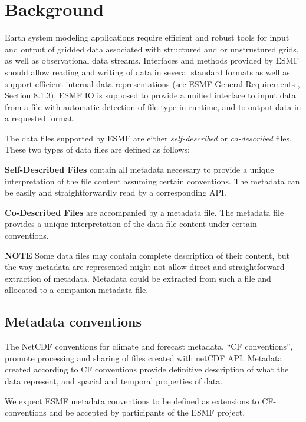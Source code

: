 
\section{Background}

Earth system modeling applications require efficient and robust tools
for input and output of gridded data associated with
structured and or unstrustured grids, as well as observational data streams.
Interfaces and methods provided by ESMF should allow reading and
writing of data in several standard formats as well as support
efficient internal data representations (see ESMF General
Requirements \cite{ESMFGenReq}, Section 8.1.3). ESMF IO is supposed to
provide a unified interface to input data from a file with automatic 
detection of file-type in runtime, and to output data in a requested format.

The data files  supported by ESMF are either {\em self-described} or
{\em co-described} files. These two types of data files are defined as
follows:


{\bf Self-Described Files} contain all metadata necessary to provide a
unique interpretation of the file content
assuming certain conventions. The metadata can be easily and
straightforwardly read by a corresponding API.

{\bf Co-Described Files} are accompanied by a metadata file. The
metadata file provides a unique interpretation of the data file content
under certain conventions. 


{\bf NOTE} Some data files may contain complete description of their
content, but the way metadata are represented might not allow direct
and straightforward extraction of metadata. Metadata could be extracted
from such a file and allocated to a companion metadata file.

\subsection{Metadata conventions} 

The NetCDF conventions for climate and forecast metadata, ``CF conventions'',
\cite{NetCDF_CF_v1_beta3} promote processing and sharing of files
created with netCDF API. Metadata created according to CF conventions
provide definitive description of what the data represent, and spacial
and temporal properties of data.

We expect ESMF metadata conventions to be defined as extensions to
CF-conventions and be accepted by participants of the ESMF project.

